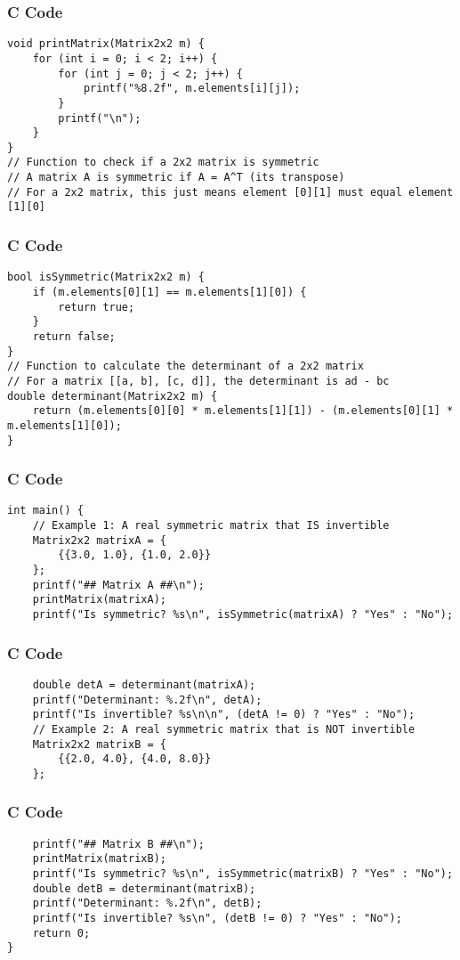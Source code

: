 \documentclass{beamer}
\begin{document}
\begin{frame}[fragile]
\frametitle{C Code}
\begin{lstlisting}
void printMatrix(Matrix2x2 m) {
    for (int i = 0; i < 2; i++) {
        for (int j = 0; j < 2; j++) {
            printf("%8.2f", m.elements[i][j]);
        }
        printf("\n");
    }
}
// Function to check if a 2x2 matrix is symmetric
// A matrix A is symmetric if A = A^T (its transpose)
// For a 2x2 matrix, this just means element [0][1] must equal element [1][0]
\end{lstlisting}
\end{frame}

\begin{frame}[fragile]
\frametitle{C Code}
\begin{lstlisting}
bool isSymmetric(Matrix2x2 m) {
    if (m.elements[0][1] == m.elements[1][0]) {
        return true;
    }
    return false;
}
// Function to calculate the determinant of a 2x2 matrix
// For a matrix [[a, b], [c, d]], the determinant is ad - bc
double determinant(Matrix2x2 m) {
    return (m.elements[0][0] * m.elements[1][1]) - (m.elements[0][1] * m.elements[1][0]);
}
\end{lstlisting}
\end{frame}

\begin{frame}[fragile]
\frametitle{C Code}
\begin{lstlisting}
int main() {
    // Example 1: A real symmetric matrix that IS invertible
    Matrix2x2 matrixA = {
        {{3.0, 1.0}, {1.0, 2.0}}
    };
    printf("## Matrix A ##\n");
    printMatrix(matrixA);
    printf("Is symmetric? %s\n", isSymmetric(matrixA) ? "Yes" : "No");
\end{lstlisting}
\end{frame}

\begin{frame}[fragile]
\frametitle{C Code}
\begin{lstlisting}
    double detA = determinant(matrixA);
    printf("Determinant: %.2f\n", detA);
    printf("Is invertible? %s\n\n", (detA != 0) ? "Yes" : "No");
    // Example 2: A real symmetric matrix that is NOT invertible
    Matrix2x2 matrixB = {
        {{2.0, 4.0}, {4.0, 8.0}}
    };
\end{lstlisting}
\end{frame}

\begin{frame}[fragile]
\frametitle{C Code}
\begin{lstlisting}
    printf("## Matrix B ##\n");
    printMatrix(matrixB);
    printf("Is symmetric? %s\n", isSymmetric(matrixB) ? "Yes" : "No");
    double detB = determinant(matrixB);
    printf("Determinant: %.2f\n", detB);
    printf("Is invertible? %s\n", (detB != 0) ? "Yes" : "No");
    return 0;
}
\end{lstlisting}
\end{frame}
\end{document}
